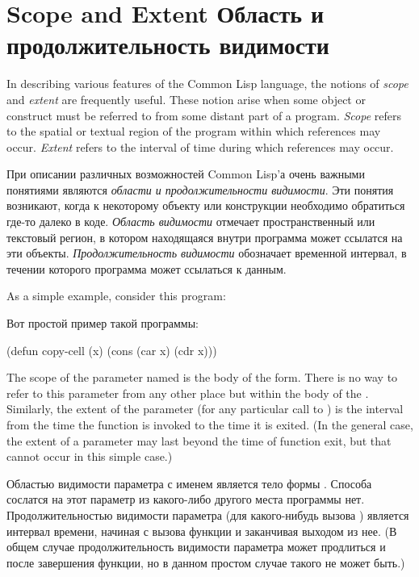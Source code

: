 
\clearpage\def\pagestatus{FINAL PROOF}

\chapter{Scope and Extent Область и продолжительность видимости}
\label{SCOPE}

In describing various features of the Common Lisp language, the notions of
\emph{scope} and \emph{extent} are frequently useful.  These notion arise when
some object or construct must be referred to from some distant part of a
program.  \emph{Scope} refers to the spatial or textual region of the
program within which references may occur.  \emph{Extent} refers to the
interval of time during which references may occur.

При описании различных возможностей Common Lisp'а очень важными понятиями
являются \emph{области и продолжительности видимости}. Эти понятия возникают,
когда к некоторому объекту или конструкции необходимо обратиться где-то далеко в
коде. \emph{Область видимости} отмечает пространственный или текстовый регион, в
котором находящаяся внутри программа может ссылатся на эти 
объекты. \emph{Продолжительность видимости} обозначает временной интервал, в течении
которого программа может ссылаться к данным.

As a simple example, consider this program:

Вот простой пример такой программы:
\begin{lisp}
(defun copy-cell (x) (cons (car x) (cdr x)))
\end{lisp}
The scope of the parameter named  is the body of the  form.
There is no way to refer to this parameter from any other place but within
the body of the .  Similarly, the extent of the parameter 
(for any particular call to ) is the interval from the time
the function is invoked to the time it is exited.  (In the general case,
the extent of a parameter may last beyond the time of function exit,
but that cannot occur in this simple case.)

Областью видимости параметра с именем  является тело формы .
Способа сослатся на этот параметр из какого-либо другого места программы
нет. Продолжительностью видимости параметра  (для какого-нибудь вызова
) является интервал времени, начиная с вызова функции и заканчивая
выходом из нее. (В общем случае продолжительность видимости параметра может
продлиться и после завершения функции, но в данном простом случае такого не
может быть.) 

